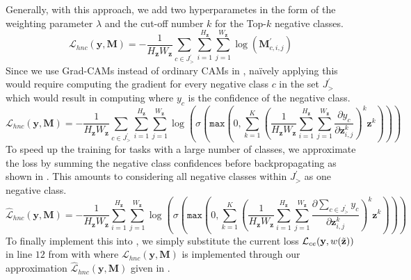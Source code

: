 Generally, with this approach, we add two hyperparametes in the form of the weighting parameter $\lambda$ and the cut-off number $k$ for the Top-$k$ negative classes.
\begin{equation}
\label{eq:hnc-kl-simple}
    \mathcal{L}_{hnc}(\mathbf{y}, \boldsymbol{M})= -\frac{1}{H_\mathbf{z} W_\mathbf{z}} \sum_{c \in J^{\prime}_>} \sum_{i=1}^{H_\mathbf{z}} \sum_{j=1}^{W_\mathbf{z}} \log \left(\boldsymbol{M}_{c, i, j}^{\prime}\right)
\end{equation}
Since we use Grad-CAMs instead of ordinary CAMs in \divcam, na\"{i}vely applying this would require computing the gradient for every negative class $c$ in the set $J^\prime_>$ which would result in computing  where $y_c$ is the confidence of the negative class. 
\begin{equation}
\label{eq:hnc-kl-grad-cam}
    \mathcal{L}_{hnc}(\mathbf{y}, \boldsymbol{M})= -\frac{1}{H_\mathbf{z} W_\mathbf{z}} \sum_{c \in J^{\prime}_>} \sum_{i=1}^{H_\mathbf{z}} \sum_{j=1}^{W_\mathbf{z}} \log \left( \sigma \left(\mathtt{max}\left(0,\sum_{k=1}^K\left(\frac{1}{H_\mathbf{z}W_\mathbf{z}} \sum_{i=1}^{H_\mathbf{z}} \sum_{j=1}^{W_\mathbf{z}} \frac{\partial y_c}{\partial \mathbf{z}_{i,j}^k}\right)^k \mathbf{z}^k\right)\right)\right)
\end{equation}
To speed up the training for tasks with a large number of classes, we approximate the loss by summing the negative class confidences before backpropagating as shown in . This amounts to considering all negative classes within $J^\prime_>$ as one negative class. 
\begin{equation}
\label{eq:hnc-kl-grad-cam-approx}
    \widehat{\mathcal{L}}_{hnc}(\mathbf{y}, \boldsymbol{M})= -\frac{1}{H_\mathbf{z} W_\mathbf{z}} \sum_{i=1}^{H_\mathbf{z}} \sum_{j=1}^{W_\mathbf{z}} \log \left( \sigma \left(\mathtt{max}\left(0,\sum_{k=1}^K\left(\frac{1}{H_\mathbf{z}W_\mathbf{z}} \sum_{i=1}^{H_\mathbf{z}} \sum_{j=1}^{W_\mathbf{z}} \frac{\partial \sum_{c \in J^{\prime}_>} y_c}{\partial \mathbf{z}_{i,j}^k}\right)^k \mathbf{z}^k\right)\right)\right)
\end{equation}
To finally implement this into \divcam, we simply substitute the current loss $\mathcal{L}_{ce}(\mathbf{y}, w(\Tilde{\mathbf{z}}))$ in line $12$ from  with  where $\mathcal{L}_{hnc}(\mathbf{y}, \boldsymbol{M})$ is implemented through our approximation $\widehat{\mathcal{L}}_{hnc}(\mathbf{y}, \boldsymbol{M})$ given in . 


